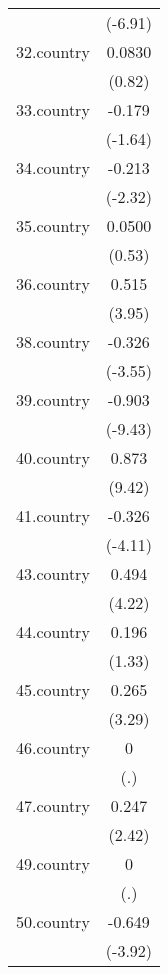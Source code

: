 {\begin{tabular}{l*{1}{c}}
            &     (-6.91)         \\
[1em]
32.country  &      0.0830         \\
            &      (0.82)         \\
[1em]
33.country  &      -0.179         \\
            &     (-1.64)         \\
[1em]
34.country  &      -0.213\sym{*}  \\
            &     (-2.32)         \\
[1em]
35.country  &      0.0500         \\
            &      (0.53)         \\
[1em]
36.country  &       0.515\sym{***}\\
            &      (3.95)         \\
[1em]
38.country  &      -0.326\sym{***}\\
            &     (-3.55)         \\
[1em]
39.country  &      -0.903\sym{***}\\
            &     (-9.43)         \\
[1em]
40.country  &       0.873\sym{***}\\
            &      (9.42)         \\
[1em]
41.country  &      -0.326\sym{***}\\
            &     (-4.11)         \\
[1em]
43.country  &       0.494\sym{***}\\
            &      (4.22)         \\
[1em]
44.country  &       0.196         \\
            &      (1.33)         \\
[1em]
45.country  &       0.265\sym{***}\\
            &      (3.29)         \\
[1em]
46.country  &           0         \\
            &         (.)         \\
[1em]
47.country  &       0.247\sym{*}  \\
            &      (2.42)         \\
[1em]
49.country  &           0         \\
            &         (.)         \\
[1em]
50.country  &      -0.649\sym{***}\\
            &     (-3.92)         \\

\end{tabular}}
